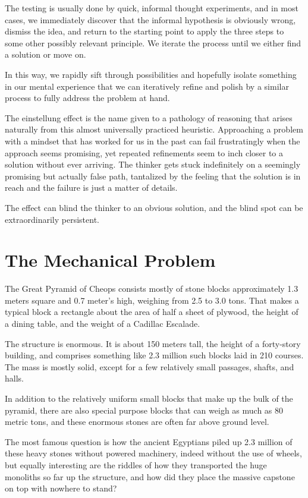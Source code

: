 \documentclass[letterpaper,11pt]{article}
\begin{document}
The testing is usually done by quick, informal thought experiments, and in most cases, we immediately discover that the informal
hypothesis is obviously wrong, dismiss the idea, and return to the starting point to apply the three steps to some other 
possibly relevant principle. 
We iterate the process until we either find a solution or move on.   

In this way, we rapidly sift through possibilities and hopefully isolate something in our mental experience that we can iteratively refine 
and polish by a similar process to fully address the problem at hand.   

The einstellung effect is the name given to a pathology of reasoning that arises naturally from this almost universally practiced heuristic.  
Approaching a problem with a mindset that has worked for us in the past can fail frustratingly when the approach seems promising, 
yet repeated refinements seem to inch closer to a solution without ever arriving. 
The thinker gets stuck indefinitely on a seemingly promising but actually false path,
tantalized by the feeling that the solution is in reach and the failure is just a matter of details. 

The effect can blind the thinker to an obvious solution, and the blind spot can be extraordinarily persistent. 

\section{The Mechanical Problem}

The Great Pyramid of Cheops consists mostly of stone blocks approximately 1.3 meters square and 0.7 meter's high, weighing from 2.5 to 3.0 tons. That makes a typical block 
a rectangle about the area of half a sheet of plywood, the height of a dining table, and the weight of a Cadillac Escalade. 

The structure is enormous. It is about 150 meters tall, the height of a forty-story building, and comprises something like 2.3 million such blocks laid in 210 courses.  
The mass is mostly solid, except for a few relatively small passages, shafts, and halls. 

In addition to the relatively uniform small blocks that make up the bulk of the pyramid, there are also special purpose blocks that can weigh as much 
as 80 metric tons, and these enormous stones are often far above ground level.

The most famous question is how the ancient Egyptians piled up 2.3 million of these heavy stones without powered machinery, indeed without the use of wheels, 
but equally interesting are the riddles of how they transported the huge monoliths so far up the structure, and how did they place the massive 
capstone on top with nowhere to stand? 
\end{document}
